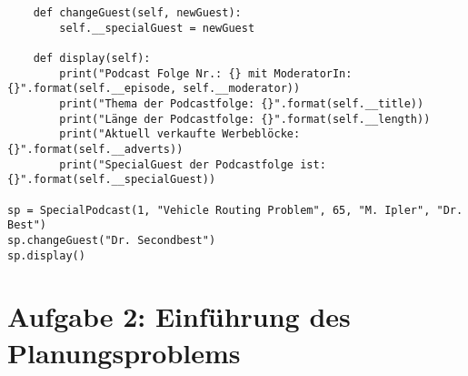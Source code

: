 \documentclass{article}
\begin{document}
\begin{enumerate}[label=(\alph*)]
\begin{lstlisting}
	def changeGuest(self, newGuest):
		self.__specialGuest = newGuest

	def display(self):
		print("Podcast Folge Nr.: {} mit ModeratorIn: {}".format(self.__episode, self.__moderator))
		print("Thema der Podcastfolge: {}".format(self.__title))
		print("Länge der Podcastfolge: {}".format(self.__length))
		print("Aktuell verkaufte Werbeblöcke: {}".format(self.__adverts))
		print("SpecialGuest der Podcastfolge ist: {}".format(self.__specialGuest))

sp = SpecialPodcast(1, "Vehicle Routing Problem", 65, "M. Ipler", "Dr. Best")
sp.changeGuest("Dr. Secondbest")
sp.display()
		\end{lstlisting}
	\end{enumerate}

	\section*{Aufgabe 2: Einführung des Planungsproblems}
\end{document}
